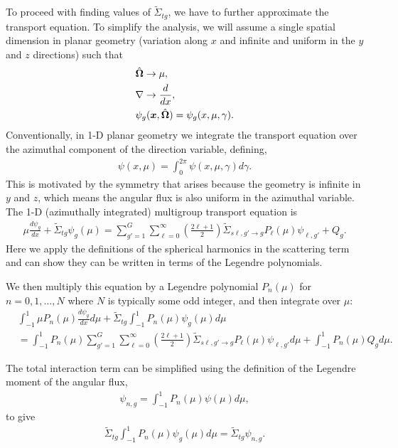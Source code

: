 To proceed with finding values of $\widetilde{\Sigma}_{tg}$, we have to further approximate the transport equation. To simplify the analysis, we will assume a single spatial dimension in planar geometry (variation along $x$ and infinite and uniform in the $y$ and $z$ directions) such that
\begin{align}
  &\hat{\mathbf{\Omega}} \rightarrow \mu, \nonumber \\
  &\nabla \rightarrow \frac{d}{dx} , \nonumber \\
  &\psi_g(\bm{x},\hat{\mathbf{\Omega}}) = \psi_g(x,\mu,\gamma) . \nonumber
\end{align}
Conventionally, in 1-D planar geometry we integrate the transport equation over the azimuthal component of the direction variable, defining,
\begin{align}
  \psi(x,\mu) = \int_0^{2\pi} \psi(x,\mu,\gamma) d\gamma .
\end{align}
This is motivated by the symmetry that arises because the geometry is infinite in $y$ and $z$, which means the angular flux is also uniform in the azimuthal variable. The 1-D (azimuthally integrated) multigroup transport equation is
\begin{align}
  \mu \frac{d\psi_g}{dx} + \widetilde{\Sigma}_{tg} \psi_g(\mu) = \sum_{g'=1}^G \sum_{\ell=0}^\infty \left( \frac{2 \ell + 1}{2} \right) \widetilde{\Sigma}_{s\ell,g' \rightarrow g} P_\ell(\mu) \psi_{\ell,g'} + Q_g .
\end{align}
Here we apply the definitions of the spherical harmonics in the scattering term and can show they can be written in terms of the Legendre polynomials.

We then multiply this equation by a Legendre polynomial $P_n(\mu)$ for $n = 0, 1, \ldots, N$ where $N$ is typically some odd integer, and then integrate over $\mu$:
\begin{align}
  &\int_{-1}^1 \mu P_n(\mu) \frac{d\psi_g}{dx} d\mu + \widetilde{\Sigma}_{tg}  \int_{-1}^1 P_n(\mu) \psi_g(\mu) d\mu \nonumber \\
  &= \int_{-1}^1 P_n(\mu) \sum_{g'=1}^G \sum_{\ell=0}^\infty \left( \frac{2 \ell + 1}{2} \right) \widetilde{\Sigma}_{s\ell,g' \rightarrow g} P_\ell(\mu) \psi_{\ell,g'} d\mu +  \int_{-1}^1 P_n(\mu) Q_g d\mu .
\end{align}

The total interaction term can be simplified using the definition of the Legendre moment of the angular flux,
\begin{align}
  \psi_{n,g} = \int_{-1}^1 P_n(\mu) \psi(\mu) d\mu ,
\end{align}
to give
\begin{align}
   \widetilde{\Sigma}_{tg}  \int_{-1}^1 P_n(\mu) \psi_g(\mu) d\mu  = \widetilde{\Sigma}_{tg} \psi_{n,g} .
\end{align}

